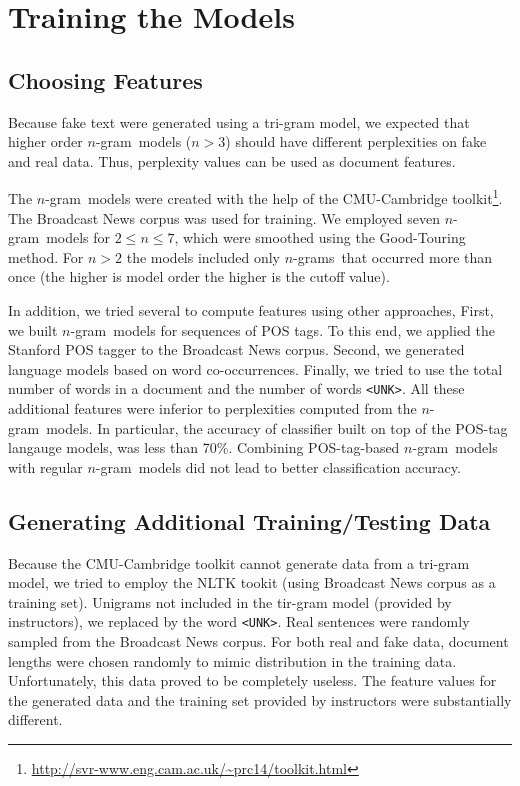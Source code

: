 \documentclass[11pt]{article}
\newcommand{\ngram}{\mbox{$n$-gram }}
\newcommand{\ngrams}{\mbox{$n$-grams }}
\newcommand{\leocomment}[1]{\todo[color=red!40,caption={Leo's comment}]{#1}}
\begin{document}
\section{Training the Models} 
\subsection{Choosing Features} Because fake text were generated using a tri-gram model, we expected that
higher order \ngram models ($n>3$) should have different perplexities on fake and real data. 
Thus, perplexity values can be used as document features. 

The \ngram models were created with the help of the CMU-Cambridge toolkit\footnote{\url{http://svr-www.eng.cam.ac.uk/~prc14/toolkit.html}}.  The Broadcast News corpus was used for training. 
We employed seven \ngram models for $2 \le n \le 7$, which were smoothed using the Good-Touring method.
For $n>2$ the models included only \ngrams that occurred more than once (the higher is model order the higher is the cutoff value).

In addition, we tried several to compute features using other approaches, 
First, we built \ngram models for sequences of POS tags. To this end, we applied the Stanford POS tagger 
to the Broadcast News corpus. Second, we generated language models based on word co-occurrences. 
\leocomment{Di, please, expand here.}
Finally, we tried to use the total number of words in a document and the number of words \texttt{<UNK>}.
All these additional features were inferior to perplexities computed from the \ngram models.
In particular, the accuracy of classifier built on top of the POS-tag langauge models,
was less than 70\%. Combining POS-tag-based \ngram models with regular \ngram models did not lead
to better classification accuracy.

\subsection{Generating Additional Training/Testing Data}\label{SectGen}
Because the CMU-Cambridge toolkit cannot generate data from a tri-gram model,
we tried to employ the NLTK tookit (using Broadcast News corpus as a training set). 
Unigrams not included in the tir-gram model (provided by instructors), we replaced by the word \texttt{<UNK>}.
Real sentences were randomly sampled from the Broadcast News corpus.
For both real and fake data, document lengths were chosen randomly to mimic distribution in the training data.
Unfortunately, this data proved to be completely useless. The feature values for the generated data
and the training set provided by instructors were substantially different.
\end{document}
